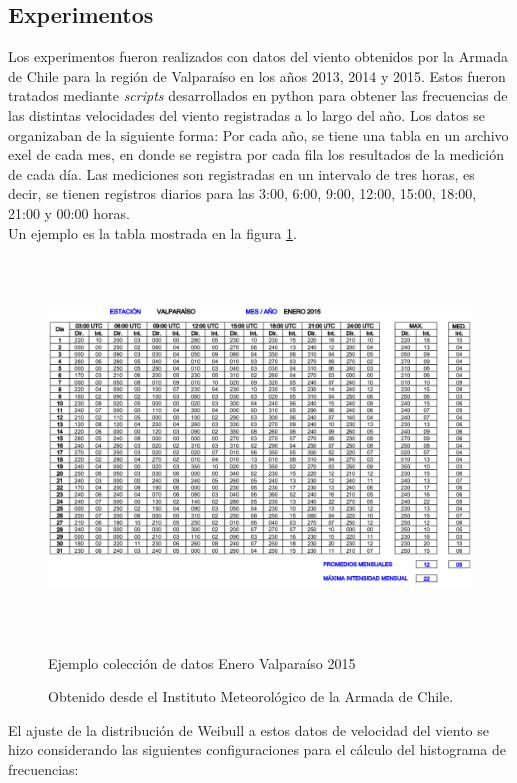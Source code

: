 \subsection{Experimentos}\label{sec:Experimentos_velocidad}
Los experimentos fueron realizados con datos del viento obtenidos por la Armada de Chile para la región de Valparaíso en los años 2013, 2014 y 2015. Estos fueron tratados mediante \emph{scripts} desarrollados en python para obtener las frecuencias de las distintas velocidades del viento registradas a lo largo del año. Los datos se organizaban de la siguiente forma: Por cada año, se tiene una tabla en un archivo exel de cada mes, en donde se registra por cada fila los resultados de la medición de cada día. Las mediciones son registradas en un intervalo de tres horas, es decir, se tienen registros diarios para las 3:00, 6:00, 9:00, 12:00, 15:00, 18:00, 21:00 y 00:00 horas.\\
Un ejemplo es la tabla mostrada en la figura \ref{fig:example_data}.
 \begin{figure}[h!]
    \centering
    \includegraphics[height=100mm]{figures/example_data.png}
    \caption{Ejemplo colección de datos Enero Valparaíso 2015}
    \vspace{-.25cm}
    \caption*{Obtenido desde el Instituto Meteorológico de la Armada de Chile.}
    \label{fig:example_data}
 \end{figure}
El ajuste de la distribución de Weibull a estos datos de velocidad del viento se hizo considerando las siguientes configuraciones para el cálculo del
histograma de frecuencias:
